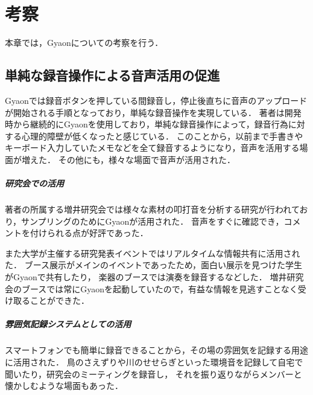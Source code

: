 \chapter{考察}
\label{chap:discussion}

本章では，Gyaonについての考察を行う．

\newpage

\section{単純な録音操作による音声活用の促進}
Gyaonでは録音ボタンを押している間録音し，停止後直ちに音声のアップロードが開始される手順となっており，単純な録音操作を実現している．
著者は開発時から継続的にGyaonを使用しており，単純な録音操作によって，録音行為に対する心理的障壁が低くなったと感じている．
このことから，以前まで手書きやキーボード入力していたメモなどを全て録音するようになり，音声を活用する場面が増えた．
その他にも，様々な場面で音声が活用された．

\paragraph*{研究会での活用}
著者の所属する増井研究会では様々な素材の叩打音を分析する研究が行われており，サンプリングのためにGyaonが活用された．
音声をすぐに確認でき，コメントを付けられる点が好評であった．

また大学が主催する研究発表イベントではリアルタイムな情報共有に活用された．
ブース展示がメインのイベントであったため，面白い展示を見つけた学生がGyaonで共有したり，
楽器のブースでは演奏を録音するなどした．
増井研究会のブースでは常にGyaonを起動していたので，有益な情報を見逃すことなく受け取ることができた．

%


\paragraph*{雰囲気記録システムとしての活用}
スマートフォンでも簡単に録音できることから，その場の雰囲気を記録する用途に活用された．
鳥のさえずりや川のせせらぎといった環境音を記録して自宅で聞いたり，研究会のミーティングを録音し，
それを振り返りながらメンバーと懐かしむような場面もあった．

